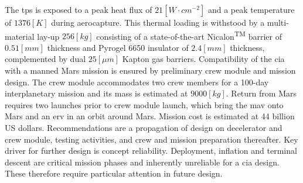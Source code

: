 \newline
\newline
The \acrlong{tps} is exposed to a peak heat flux of $21 \left[W \cdot cm^{-2}\right]$ and a peak temperature of $1376 \left[K\right]$ during aerocapture. This thermal loading is withstood by a multi-material lay-up $256 \left[kg\right]$ consisting of a state-of-the-art Nicalon\textsuperscript{TM} barrier of $0.51 \left[mm\right]$ thickness and Pyrogel\textsuperscript{\textregistered} 6650 insulator of $2.4 \left[mm\right]$ thickness, complemented by dual $25 \left[\mu m\right]$ Kapton gas barriers. 
\newline
\newline
Compatibility of the \acrshort{cia} with a manned Mars mission is ensured by preliminary crew module and mission design. The crew module accommodates two crew members for a 100-day interplanetary mission and its mass is estimated at $9000 \left[kg\right]$. Return from Mars requires two launches prior to crew module launch, which bring the \acrlong{mav} onto Mars and an \acrlong{erv} in an orbit around Mars. Mission cost is estimated at 44 billion US dollars.
\newline
\newline
Recommendations are a propagation of design on decelerator and crew module, testing activities, and crew and mission preparation thereafter. Key driver for further design is concept reliability. Deployment, inflation and terminal descent are critical mission phases and inherently unreliable for a \acrshort{cia} design. These therefore require particular attention in future design.
